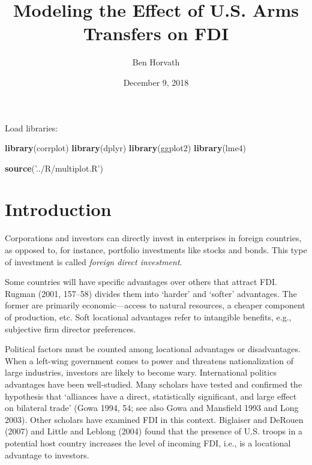 \documentclass[11pt,]{article}
\title{Modeling the Effect of U.S. Arms Transfers on FDI}
\author{Ben Horvath}
\date{December 9, 2018}
\newenvironment{Shaded}{\begin{snugshade}}{\end{snugshade}}
\newcommand{\KeywordTok}[1]{\textcolor[rgb]{0.13,0.29,0.53}{\textbf{#1}}}
\newcommand{\NormalTok}[1]{#1}
\newcommand{\StringTok}[1]{\textcolor[rgb]{0.31,0.60,0.02}{#1}}
\begin{document}
\maketitle

{
\setcounter{tocdepth}{2}
\tableofcontents
}
Load libraries:

\begin{Shaded}
\begin{Highlighting}[]
\KeywordTok{library}\NormalTok{(corrplot)}
\KeywordTok{library}\NormalTok{(dplyr)}
\KeywordTok{library}\NormalTok{(ggplot2)}
\KeywordTok{library}\NormalTok{(lme4)}

\KeywordTok{source}\NormalTok{(}\StringTok{'../R/multiplot.R'}\NormalTok{)}
\end{Highlighting}
\end{Shaded}

\hypertarget{introduction}{%
\section{Introduction}\label{introduction}}

Corporations and investors can directly invest in enterprises in foreign
countries, as opposed to, for instance, portfolio investments like
stocks and bonds. This type of investment is called \emph{foreign direct
investment}.

Some countries will have specific advantages over others that attract
FDI. Rugman (2001, 157--58) divides them into `harder' and `softer'
advantages. The former are primarily economic---access to natural
resources, a cheaper component of production, etc. Soft locational
advantages refer to intangible benefits, e.g., subjective firm director
preferences.

Political factors must be counted among locational advantages or
disadvantages. When a left-wing government comes to power and threatens
nationalization of large industries, investors are likely to become
wary. International politics advantages have been well-studied. Many
scholars have tested and confirmed the hypothesis that `alliances have a
direct, statistically significant, and large effect on bilateral trade'
(Gowa 1994, 54; see also Gowa and Mansfield 1993 and Long 2003). Other
scholars have examined FDI in this context. Biglaiser and DeRouen (2007)
and Little and Leblong (2004) found that the presence of U.S. troops in
a potential host country increases the level of incoming FDI, i.e., is a
locational advantage to investors.
\end{document}
